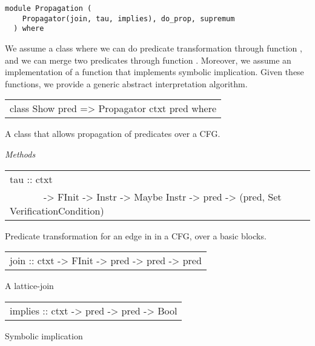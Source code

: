 \label{module:Propagation}
\haddockbeginheader
{\haddockverb\begin{verbatim}
module Propagation (
    Propagator(join, tau, implies), do_prop, supremum
  ) where\end{verbatim}}
\haddockendheader

We assume a class where we can do predicate transformation through function ,
and we can merge two predicates through function .
Moreover, we assume an implementation of a function  that implements symbolic implication.
Given these functions, we provide a generic abstract interpretation algorithm.\par
\begin{haddockdesc}
\item[\begin{tabular}{@{}l}
class Show pred => Propagator ctxt pred where
\end{tabular}]
{\haddockbegindoc
A class that allows propagation of predicates over a CFG.\par
\haddockpremethods{}\emph{Methods}
\begin{haddockdesc}
\item[\begin{tabular}{@{}l}
tau :: ctxt\\\ \ \ \ \ \ \ -> FInit -> {\char 91}Instr{\char 93} -> Maybe {\char 91}Instr{\char 93} -> pred -> (pred, Set VerificationCondition)
\end{tabular}]
{\haddockbegindoc
Predicate transformation for an edge in in a CFG, over a basic blocks.\par}
\end{haddockdesc}
\begin{haddockdesc}
\item[\begin{tabular}{@{}l}
join :: ctxt -> FInit -> pred -> pred -> pred
\end{tabular}]
{\haddockbegindoc
A lattice-join\par}
\end{haddockdesc}
\begin{haddockdesc}
\item[\begin{tabular}{@{}l}
implies :: ctxt -> pred -> pred -> Bool
\end{tabular}]
{\haddockbegindoc
Symbolic implication\par}
\end{haddockdesc}}
\end{haddockdesc}
